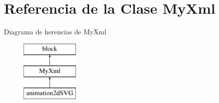 \hypertarget{classMyXml}{\section{\-Referencia de la \-Clase \-My\-Xml}
\label{classMyXml}
}
\-Diagrama de herencias de \-My\-Xml\begin{figure}[H]
\begin{center}
\leavevmode
\includegraphics[height=3.000000cm]{classMyXml}
\end{center}
\end{figure}
